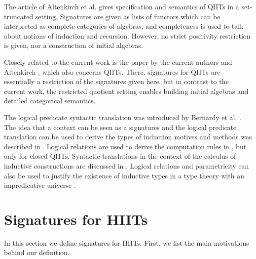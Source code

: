 \documentclass[dvipsnames]{lmcs} %
\newcommand{\1}{\mathsf{1}} \renewcommand{\Pr}{\mathsf{Pr}}
\theoremstyle{plain}\newtheorem{satz}[thm]{Satz} %
\begin{document}
The article of Altenkirch et al. \cite{gabe} gives specification and semantics
of QIITs in a set-truncated setting. Signatures are given as lists of functors
which can be interpreted as complete categories of algebras, and completeness is
used to talk about notions of induction and recursion.  However, no strict
positivity restriction is given, nor a construction of initial algebras.

Closely related to the current work is the paper by the current authors and
Altenkirch \cite{kaposi2019constructing}, which also concerns QIITs. There,
signatures for QIITs are essentially a restriction of the signatures given here,
but in contrast to the current work, the restricted quotient setting enables
building initial algebras and detailed categorical semantics.

The logical predicate syntactic translation was introduced by Bernardy et
al. \cite{bernardy2010parametricity}. The idea that a context can be seen as a
signatures and the logical predicate translation can be used to derive the types
of induction motives and methods was described in \cite[Section
  5.3]{ttintt}. Logical relations are used to derive the computation rules in
\cite[Section 4.3]{kaposi-phd}, but only for closed QIITs. Syntactic
translations in the context of the calculus of inductive constructions are
discussed in \cite{next700}. Logical relations and parametricity can also be
used to justify the existence of inductive types in a type theory with an
impredicative universe \cite{atkey}.

\section{Signatures for HIITs}
\label{sec:signatures}

In this section we define signatures for HIITs. First, we list
the main motivations behind our definition.
\end{document}
